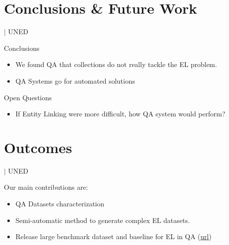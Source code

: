\documentclass[]{beamer}
\newcommand{\mShortTitle}{\secname \hfill {\scriptsize$|$ UNED}}
\begin{document}
\section{Conclusions \& Future Work}
  \begin{frame}{\mShortTitle}
    \begin{alertblock}{Conclusions}
      \begin{itemize}
        \item We found QA that collections do not really tackle the EL problem.
        \item QA Systems go for automated solutions
      \end{itemize}
    \end{alertblock}
    \begin{alertblock}{Open Questions}
      \begin{itemize}
        \item If Entity Linking were more difficult, how QA system would perform?
      \end{itemize}
    \end{alertblock}
  \end{frame}

\section{Outcomes}
  \begin{frame}{\mShortTitle}
    \begin{alertblock}{Our main contributions are:}
      \begin{itemize}
        \item QA Datasets characterization
        \item Semi-automatic method to generate complex EL datasets.
        \item Release large benchmark dataset and baseline for EL in QA (\href{https://github.com/m0n0l0c0/benchmarking_entity_linking/blob/master/datasets/Complex-EL4QA.json}{url})
      \end{itemize}
    \end{alertblock}      
  \end{frame}
\end{document}

